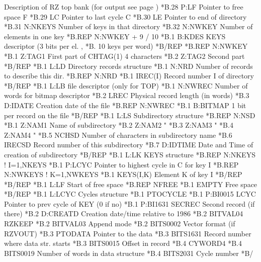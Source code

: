 \begin{XMPt}{Description of RZ top bank (for output see page \pageref{xmp:rztop})}
*B.28    P:LF          Pointer to free space  F                 
*B.29    LC            Pointer to last cycle  C                 
*B.30    LE            Pointer to end of directory              
*B.31    N:NKEYS       Number of keys in that directory         
*B.32    N:NWKEY       Number of elements in one key 
*B.REP                 N:NWKEY + 9 / 10           
*B.1     B:KDES        KEYS descriptor (3 bits per el. ,
*B.                    10 keys per word) 
*B/REP    
*B.REP               N:NWKEY           
*B.1     Z:TAG1       First part of CHTAG(1) 4 characters      
*B.2     Z:TAG2       Second part                              
*B/REP    
*B.1     L:LD          Directory records structure
*B.1     N:NRD         Number of records to describe this dir.  
*B.REP               N:NRD           
*B.1     IREC(I)       Record number I of directory             
*B/REP
*B.1     L:LB          file descriptor (only for TOP)
*B.1     N:NWREC       Number of words for bitmap descriptor      
*B.2     LREC          Physical record length (in words)          
*B.3     D:IDATE       Creation date of the file                  
*B.REP               N:NWREC            
*B.1     B:BITMAP      1 bit per record on the file                       
*B/REP
*B.1     L:LS          Subdirectory  structure
*B.REP               N:NSD            
*B.1     Z:NAM1        Name of subdirectory                   
*B.2     Z:NAM2        "                                          
*B.3     Z:NAM3        "                                          
*B.4     Z:NAM4        "                                          
*B.5     NCHSD         Number of characters in subdirectory name  
*B.6     IRECSD        Record number of this subdirectory         
*B.7     D:IDTIME      Date and Time of creation of subdirectory  
*B/REP
*B.1     L:LK          KEYS structure
*B.REP               N:NKEYS        ! I=1,NKEYS   
*B.1     P:LCYC        Pointer to highest cycle in C for key I
*B.REP               N:NWKEYS       ! K=1,NWKEYS 
*B.1     KEYS(I,K)     Element K of key I                     
*B/REP
*B/REP
*B.1     L:LF          Start of free space
*B.REP   NFREE
*B.1     EMPTY         Free space
*B/REP
*B.1     L:LCYC        Cycles structure
*B.1     PTOCYCLE       
*B.1     P:BI0015      LCYC Pointer to prev cycle of KEY (0 if no)
*B.1     P:BI1631      SECREC Second record (if there)
*B.2     D:CREATD      Creation date/time relative to 1986
*B.2     BITVAL04      RZKEEP
*B.2     BITVAL03      Append mode
*B.2     BITS0002      Vector format (if RZVOUT)
*B.3     PTODATA       Pointer to the data
*B.3     BITS1631      Record number where data str. starts
*B.3     BITS0015      Offset in record
*B.4     CYWORD4       
*B.4     BITS0019      Number of words in data structure
*B.4     BITS2031      Cycle number
*B/
\end{XMPt} 

    
